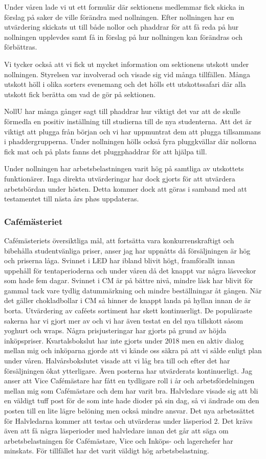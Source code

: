 \documentclass[../_main/handlingar.tex]{subfiles}
\begin{document}
Under våren lade vi ut ett formulär där sektionens medlemmar fick skicka in förslag på saker de ville förändra med nollningen. Efter nollningen har en utvärdering skickats ut till både nollor och phaddrar för att få reda på hur nollningen upplevdes samt få in förslag på hur nollningen kan förändras och förbättras. 

Vi tycker också att vi fick ut mycket information om sektionens utskott under nollningen. Styrelsen var involverad och visade sig vid många tillfällen. Många utskott höll i olika sorters evenemang och det hölls ett utskottssafari där alla utskott fick berätta om vad de gör på sektionen.

NollU har många gånger sagt till phaddrar hur viktigt det var att de skulle förmedla en positiv inställning till studierna till de nya studenterna. Att det är viktigt att plugga från början och vi har uppmuntrat dem att plugga tillsammans i phaddergrupperna. Under nollningen hölls också fyra pluggkvällar där nollorna fick mat och på plats fanns det pluggphaddrar för att hjälpa till.

Under nollningen har arbetsbelastningen varit hög på samtliga av utskottets funktionärer. Inga direkta utvärderingar har dock gjorts för att utvärdera arbetsbördan under hösten. Detta kommer dock att göras i samband med att testamentet till nästa års phøs uppdateras.

\subsubsection*{Cafémästeriet}
Cafémästeriets översiktliga mål, att fortsätta vara konkurrenskraftigt och bibehålla studentvänliga priser, anser jag har uppnåtts då försäljningen är hög och priserna låga. Svinnet i LED har ibland blivit högt, framförallt innan uppehåll för tentaperioderna och under våren då det knappt var några läsveckor som hade fem dagar. Svinnet i CM är på bättre nivå, mindre läsk har blivit för gammal tack vare tydlig datummärkning och mindre beställningar åt gången. När det gäller chokladbollar i CM så hinner de knappt landa på hyllan innan de är borta. 
Utvärdering av caféets sortiment har skett kontinuerligt. De populäraste sakerna har vi gjort mer av och vi har även testat en del nya tillskott såsom yoghurt och wraps. Några prisjusteringar har gjorts på grund av höjda inköpspriser.
Kvartalsbokslut har inte gjorts under 2018 men en aktiv dialog mellan mig och inköparna gjorde att vi kände oss säkra på att vi sålde enligt plan under våren. Halvårsbokslutet visade att vi låg bra till och efter det har försäljningen ökat ytterligare. 
Även posterna har utvärderats kontinuerligt. Jag anser att Vice Cafémästare har fått en tydligare roll i år och arbetsfördelningen mellan mig som Cafémästare och dem har varit bra. Halvledare visade sig att bli en väldigt tuff post för de som inte hade dioder på sin dag, så vi ändrade om den posten till en lite lägre belöning men också mindre ansvar. Det nya arbetssättet för  Halvledarna kommer att testas och utvärderas under läsperiod 2. Det krävs även att få några läsperioder med halvledare innan det går att säga om arbetsbelastningen för Cafémästare, Vice och Inköps- och lagerchefer har minskats. För tillfället har det varit väldigt hög arbetsbelastning.
\end{document}

